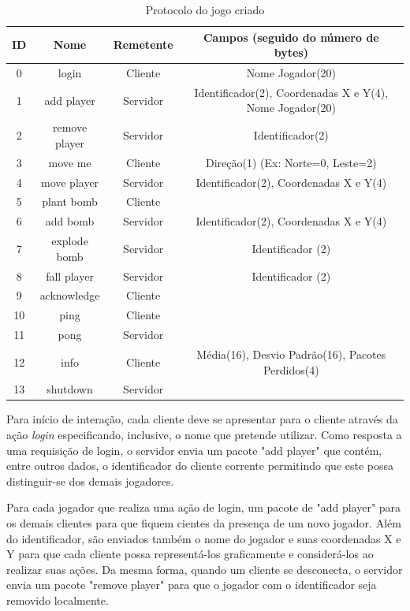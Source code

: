 \documentclass[12pt]{article}
\begin{document}
\begin{table}
  \center
  \footnotesize
  \begin{tabular}{|c|c|c|c|}
  \hline
    \textbf{ID} & \textbf{Nome} & \textbf{Remetente} & \textbf{Campos (seguido do número de bytes)} \\ \hline
    0 & login & Cliente & Nome Jogador(20)  \\ \hline
    1 & add player & Servidor & Identificador(2), Coordenadas X e Y(4), Nome Jogador(20)\\ \hline
    2 & remove player & Servidor & Identificador(2) \\ \hline
    3 & move me & Cliente & Direção(1) (Ex: Norte=0, Leste=2) \\ \hline
    4 & move player & Servidor & Identificador(2), Coordenadas X e Y(4) \\ \hline
    5 & plant bomb & Cliente & \\ \hline
    6 & add bomb & Servidor &  Identificador(2), Coordenadas X e Y(4)  \\ \hline
    7 & explode bomb & Servidor & Identificador (2) \\ \hline
    8 & fall player & Servidor & Identificador (2) \\ \hline
    9 & acknowledge & Cliente & \\ \hline
   10 & ping & Cliente & \\ \hline
   11 & pong & Servidor & \\ \hline
   12 & info & Cliente & Média(16), Desvio Padrão(16), Pacotes Perdidos(4)  \\ \hline
   13 & shutdown & Servidor &\\ \hline
  \end{tabular} 
\caption{Protocolo do jogo criado}
\label{tab:protocolo}
\end{table} 

Para início de interação, cada cliente deve se apresentar para o cliente
através da ação \textit{login} especificando, inclusive, o nome que pretende
utilizar. Como resposta a uma requisição de login, o servidor envia um pacote
"add player" que contém, entre outros dados, o identificador do cliente
corrente permitindo que este possa distinguir-se dos demais jogadores.

Para cada jogador que realiza uma ação de login, um pacote de "add player" para
os demais clientes para que fiquem cientes da presença de um novo jogador. Além
do identificador, são enviados também o nome do jogador e suas coordenadas X e
Y para que cada cliente possa representá-los graficamente e considerá-los ao
realizar suas ações. Da mesma forma, quando um cliente se desconecta, o
servidor envia um pacote "remove player" para que o jogador com o identificador
seja removido localmente.
\end{document}
